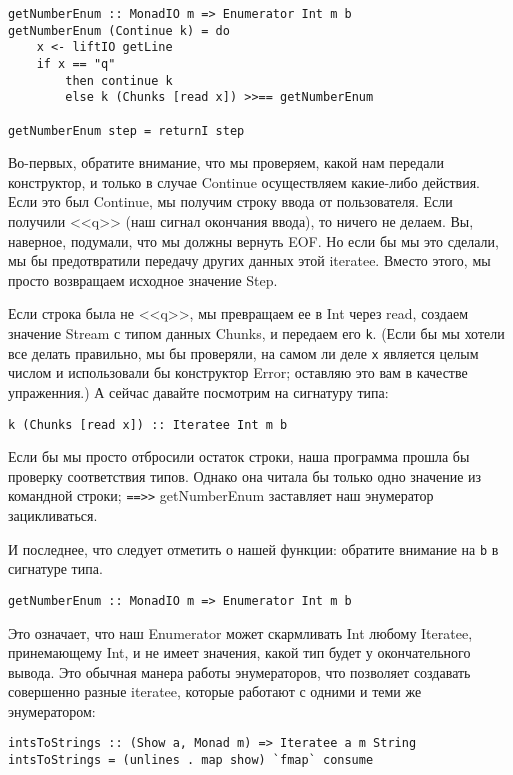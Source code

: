 \begin{lstlisting}
getNumberEnum :: MonadIO m => Enumerator Int m b
getNumberEnum (Continue k) = do
    x <- liftIO getLine
    if x == "q"
        then continue k
        else k (Chunks [read x]) >>== getNumberEnum
        
getNumberEnum step = returnI step
\end{lstlisting}

Во-первых, обратите внимание, что мы проверяем, какой нам передали конструктор, и только в случае Continue осуществляем какие-либо действия. Если это был Continue, мы получим строку ввода от пользователя. Если получили <<q>> (наш сигнал окончания ввода), то ничего не делаем. Вы, наверное, подумали, что мы должны вернуть EOF. Но если бы мы это сделали, мы бы предотвратили передачу других данных этой iteratee. Вместо этого, мы просто возвращаем исходное значение Step.

Если строка была не <<q>>, мы превращаем ее в Int через read, создаем значение Stream с типом данных Chunks, и передаем его \lstinline'k'. (Если бы мы хотели все делать правильно, мы бы проверяли, на самом ли деле \lstinline'x' является целым числом и использовали бы конструктор Error; оставляю это вам в качестве упраженния.) А сейчас давайте посмотрим на сигнатуру типа:

\begin{lstlisting}
k (Chunks [read x]) :: Iteratee Int m b
\end{lstlisting}

Если бы мы просто отбросили остаток строки, наша программа прошла бы проверку соответствия типов. Однако она читала бы только одно значение из командной строки; \lstinline'==>>' getNumberEnum заставляет наш энумератор зацикливаться.

И последнее, что следует отметить о нашей функции: обратите внимание на \lstinline'b' в сигнатуре типа.

\begin{lstlisting}
getNumberEnum :: MonadIO m => Enumerator Int m b
\end{lstlisting}

Это означает, что наш Enumerator может скармливать Int любому Iteratee, принемающему Int, и не имеет значения, какой тип будет у окончательного вывода. Это обычная манера работы энумераторов, что позволяет создавать совершенно разные iteratee, которые работают с одними и теми же энумератором:

\begin{lstlisting}
intsToStrings :: (Show a, Monad m) => Iteratee a m String
intsToStrings = (unlines . map show) `fmap` consume
\end{lstlisting}

